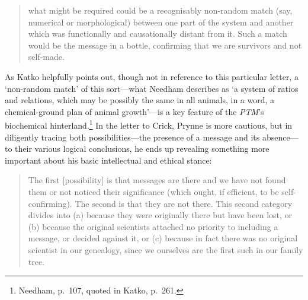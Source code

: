 \documentclass[]{article}
\begin{document}
\begin{quote}
\singlespacing what might be required could be a recognisably non-random
match (say, numerical or morphological) between one part of the system
and another which was functionally and causationally distant from it.
Such a match would be the message in a bottle, confirming that we are
survivors and not self-made.
\end{quote}

\noindent As Katko helpfully points out, though not in reference to this
particular letter, a ‘non-random match’ of this sort—what Needham
describes as ‘a system of ratios and relations, which may be possibly
the same in all animals, in a word, a chemical-ground plan of animal
growth’—is a key feature of the \emph{PTM}’s biochemical
hinterland.\footnote{Needham, p.~107, quoted in Katko, p.~261.} In the
letter to Crick, Prynne is more cautious, but in diligently tracing both
possibilities—the presence of a message and its absence—to their various
logical conclusions, he ends up revealing something more important about
his basic intellectual and ethical stance:

\begin{quote}
\singlespacing The first {[}possibility{]} is that messages are there
and we have not found them or not noticed their significance (which
ought, if efficient, to be self-confirming). The second is that they are
not there. This second category divides into (a) because they were
originally there but have been lost, or (b) because the original
scientists attached no priority to including a message, or decided
against it, or (c) because in fact there was no original scientist in
our genealogy, since we ourselves are the first such in our family tree.
\end{quote}
\end{document}
